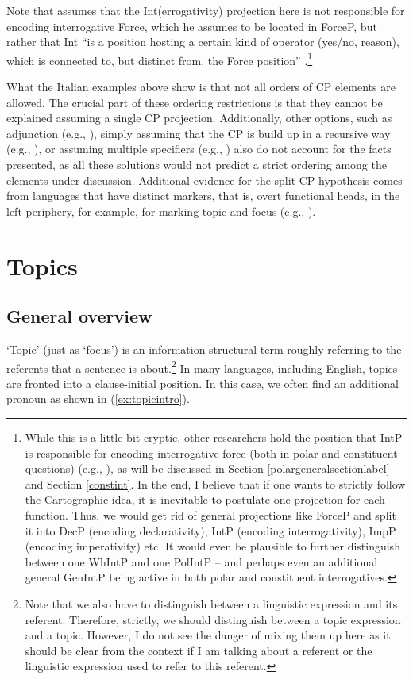 \noindent Note that \citet{rizzi2001position} assumes that the Int(errogativity) projection here is not responsible for encoding interrogative Force, which he assumes to be located in ForceP, but rather that Int ``is a position hosting a certain kind of operator (yes/no, reason), which is connected to, but distinct from, the Force position'' \citep[206]{rizzi2013notes}.\footnote{While this is a little bit cryptic, other researchers hold the position that IntP is responsible for encoding interrogative force (both in polar and constituent questions) (e.g., \citealt{aboh2010sa}), as will be discussed in Section \ref{polargeneralsectionlabel} and Section \ref{constint}. In the end, I believe that if one wants to strictly follow the Cartographic idea, it is inevitable to postulate one projection for each function. Thus, we would get rid of general projections like ForceP and split it into DecP (encoding declarativity), IntP (encoding interrogativity), ImpP (encoding imperativity) etc. It would even be plausible to further distinguish between one WhIntP and one PolIntP -- and perhaps even an additional general GenIntP being active in both polar and constituent interrogatives.}

What the Italian examples above show is that not all orders of CP elements are allowed. The crucial part of these ordering restrictions is that they cannot be explained assuming a single CP projection. Additionally, other options, such as adjunction (e.g., \citealt{de2007french}), simply assuming that the CP is build up in a recursive way (e.g., \citealt{mccloskey1992adjunction, suner1993indirect}), or assuming multiple specifiers (e.g., \citealt{chomsky1995categories}) also do not account for the facts presented, as all these solutions would not predict a strict ordering among the elements under discussion. Additional evidence for the split-CP hypothesis comes from languages that have distinct markers, that is, overt functional heads, in the left periphery, for example, for marking topic and focus (e.g., \citealt{aboh2004left}).

\section{Topics}\label{generaltopicsection}

\subsection{General overview}
\label{finersplitstopics}
`Topic' (just as `focus') is an information structural term roughly referring to the referents that a sentence is about.\footnote{Note that we also have to distinguish between a linguistic expression and its referent. Therefore, strictly, we should distinguish between a topic expression and a topic. However, I do not see the danger of mixing them up here as it should be clear from the context if I am talking about a referent or the linguistic expression used to refer to this referent.} In many languages, including English, topics are fronted into a clause-initial position. In this case, we often find an additional pronoun as shown in (\ref{ex:topicintro}).

